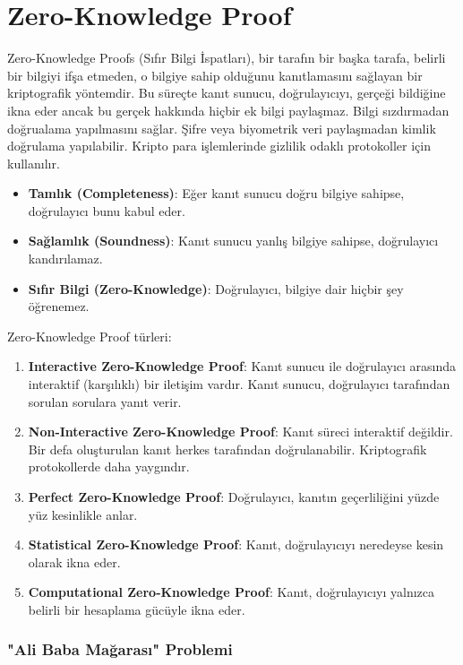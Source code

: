 \section{Zero-Knowledge Proof}

Zero-Knowledge Proofs (Sıfır Bilgi İspatları), bir tarafın bir başka tarafa, belirli bir bilgiyi ifşa etmeden, o bilgiye sahip olduğunu kanıtlamasını sağlayan bir kriptografik yöntemdir. Bu süreçte kanıt sunucu, doğrulayıcıyı, gerçeği bildiğine ikna eder ancak bu gerçek hakkında hiçbir ek bilgi paylaşmaz. Bilgi sızdırmadan doğrualama yapılmasını sağlar. Şifre veya biyometrik veri paylaşmadan kimlik doğrulama yapılabilir. Kripto para işlemlerinde gizlilik odaklı protokoller için kullanılır.

\begin{itemize}
    \item \textbf{Tamlık (Completeness)}: Eğer kanıt sunucu doğru bilgiye sahipse, doğrulayıcı bunu kabul eder.
    \item \textbf{Sağlamlık (Soundness)}: Kanıt sunucu yanlış bilgiye sahipse, doğrulayıcı kandırılamaz.
    \item \textbf{Sıfır Bilgi (Zero-Knowledge)}: Doğrulayıcı, bilgiye dair hiçbir şey öğrenemez.
\end{itemize}

Zero-Knowledge Proof türleri:

\begin{enumerate}
    \item \textbf{Interactive Zero-Knowledge Proof}: Kanıt sunucu ile doğrulayıcı arasında interaktif (karşılıklı) bir iletişim vardır. Kanıt sunucu, doğrulayıcı tarafından sorulan sorulara yanıt verir.
    \item \textbf{Non-Interactive Zero-Knowledge Proof}: Kanıt süreci interaktif değildir. Bir defa oluşturulan kanıt herkes tarafından doğrulanabilir. Kriptografik protokollerde daha yaygındır.
    \item \textbf{Perfect Zero-Knowledge Proof}: Doğrulayıcı, kanıtın geçerliliğini yüzde yüz kesinlikle anlar.
    \item \textbf{Statistical Zero-Knowledge Proof}: Kanıt, doğrulayıcıyı neredeyse kesin olarak ikna eder.
    \item \textbf{Computational Zero-Knowledge Proof}: Kanıt, doğrulayıcıyı yalnızca belirli bir hesaplama gücüyle ikna eder.
\end{enumerate}

\newpage

\subsubsection{"Ali Baba Mağarası" Problemi}

